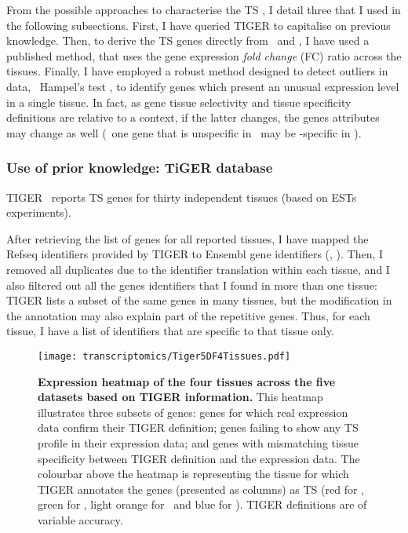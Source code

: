From the possible approaches to characterise the \gls{TS} \pcgs,
I detail three that I used in the following subsections.
First, I have queried \gls{TIGER} to capitalise on previous knowledge.
Then, to derive the \gls{TS} genes directly from \setOne\ and \setTwo,
I have used a published method,
that uses the gene expression \emph{fold change} (FC) ratio across the tissues.
Finally, I have employed a robust method designed to detect outliers in data,
\ie\ Hampel's test ,
to identify genes which present an unusual expression level in a single tissue.
In fact, as gene tissue selectivity and tissue specificity definitions are
relative to a context,
if the latter changes,
the genes attributes may change as well
(\eg\ one gene that is unspecific in \setTwo\ may be \heart{}-specific in \setOne).


\subsubsection{Use of prior knowledge: TiGER database}\label{subsub:Tiger}

\gls{TIGER}~ reports \gls{TS} genes for thirty independent tissues
(based on \glspl{EST} experiments).

After retrieving the list of genes for all reported tissues,
I have mapped the \gls{Refseq} identifiers provided by \gls{TIGER}
to \gls{Ensembl} gene identifiers (, ).
Then, I removed all duplicates due to the identifier translation within each tissue,
and I also filtered out all the genes identifiers that
I found in more than one tissue:
\gls{TIGER} lists a subset of the same genes in many tissues,
but the modification in the annotation may also explain part of the
repetitive genes.
Thus, for each tissue,
I have a list of identifiers that are specific to that tissue only.

\begin{figure}[!ht]
    \texttt{[image: transcriptomics/Tiger5DF4Tissues.pdf]}\centering
    \vspace{-.15in}
    \caption[Expression heatmap of the four tissues across the five datasets based on
    TiGER]{\label{fig:TigerGenes}\textbf{Expression heatmap of the four tissues
    across the five datasets based on \gls{TIGER} information.}
    This heatmap illustrates three subsets of genes:
    genes for which real expression data confirm their \gls{TIGER} definition;
    genes failing to show any \gls{TS} profile in their expression data; and
    genes with mismatching tissue specificity between \gls{TIGER}
    definition and the expression data.
    The colourbar above the heatmap is representing the tissue
    for which \gls{TIGER} annotates the genes (presented as columns) as \gls{TS}
    (red for \Heart, green for \kidney, light orange for \liver\ and blue for \testis).
    \gls{TIGER} definitions are of variable accuracy.
    }
\end{figure}

